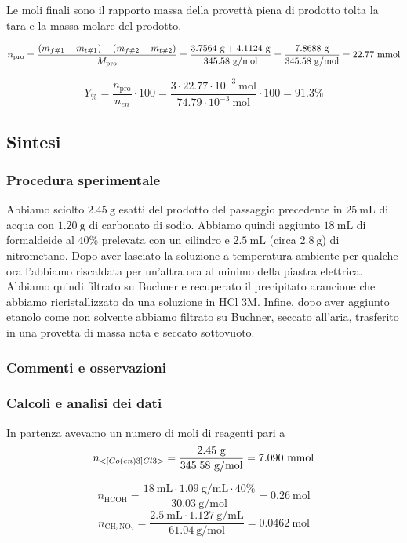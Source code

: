 Le moli finali sono il rapporto massa della provettà piena di prodotto tolta la tara e la massa molare del prodotto.

\[ n_\text{pro} = \frac{(m_{f\#1} - m_{t\#1})+(m_{f\#2} - m_{t\#2})}{M_\text{pro}} 
 = \frac{ 3.7564 \mathrm{\ g} + 4.1124 \mathrm{\ g} }{ 345.58 \mathrm{\ g/mol}} =  \frac{7.8688 \mathrm{~g}}{345.58 \mathrm{~g} / \mathrm{mol}}=22.77 \mathrm{\ mmol}\]

\[ Y_\% = \frac{n_\text{pro}}{n_{en}}\cdot 100  = \frac{3 \cdot 22.77 \cdot 10^{-3} \mathrm{~mol}}{74.79 \cdot 10^{-3} \mathrm{~mol}} \cdot 100 =91.3\%\]


\subsection{Sintesi }
\subsubsection{Procedura sperimentale}
Abbiamo sciolto $2.45 \mathrm{~g}$ esatti del prodotto del passaggio precedente in $25 \mathrm{~mL}$ di acqua con $1.20 \mathrm{~g}$ di carbonato di sodio. Abbiamo quindi aggiunto $18 \mathrm{~mL}$ di formaldeide al $40 \%$ prelevata con un cilindro e $2.5 \mathrm{~mL}$ (circa $2.8 \mathrm{~g}$) di nitrometano. Dopo aver lasciato la soluzione a temperatura ambiente per qualche ora l'abbiamo riscaldata per un'altra ora al minimo della piastra elettrica. Abbiamo quindi filtrato su Buchner e recuperato il precipitato arancione che abbiamo ricristallizzato da una soluzione in $\mathrm{HCl} $ 3M. Infine, dopo aver aggiunto etanolo come non solvente abbiamo filtrato su Buchner, seccato all'aria, trasferito in una provetta di massa nota e seccato sottovuoto.
\subsubsection{Commenti e osservazioni}



\subsubsection{Calcoli e analisi dei dati}
In partenza avevamo un numero di moli di reagenti pari a
\[ n_{<[Co(en)3]Cl3>}=\frac{2.45 \mathrm{~g}}{345.58 \mathrm{~g} / \mathrm{mol}}= 7.090 \mathrm{~mmol} \]

\[ n_{\mathrm{HCOH}}=\frac{18 \mathrm{~mL} \cdot 1.09 \mathrm{~g} / \mathrm{mL} \cdot 40 \%}{30.03 \mathrm{~g} / \mathrm{mol}}=0.26 \mathrm{~mol} \]
\[ n_{\mathrm{CH}_3 \mathrm{NO}_2}=\frac{2.5 \mathrm{~mL} \cdot 1.127 \mathrm{~g} / \mathrm{mL}}{61.04 \mathrm{~g} / \mathrm{mol}}=0.0462 \mathrm{~mol} \]

